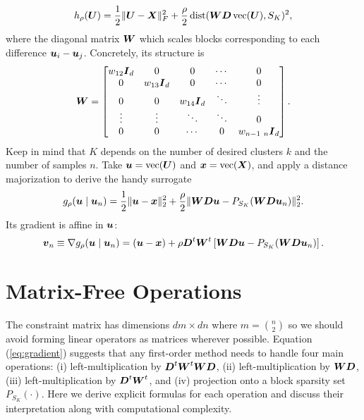 \documentclass[11pt]{article}
\begin{document}
\begin{equation}
    \label{eq:penalized-loss}
    h_{\rho}(\boldsymbol{U})
    =
    \frac{1}{2}\|\boldsymbol{U} - \boldsymbol{X}\|_{F}^{2}
    +
    \frac{\rho}{2} \mathop{\rm dist}\nolimits(\boldsymbol{W} \boldsymbol{D} \mathop{\rm vec}\nolimits(\boldsymbol{U}), S_{K})^{2},
\end{equation}
where the diagonal matrix \(\boldsymbol{W}\) which scales blocks corresponding to each difference \(\boldsymbol{u}_{i} - \boldsymbol{u}_{j}\).
Concretely, its structure is
\begin{equation*}
    \boldsymbol{W}
    =
    \begin{bmatrix}
        w_{12} \boldsymbol{I}_{d} & 0 & 0 & \cdots & 0 \\
        0 & w_{13} \boldsymbol{I}_{d} & 0 & \cdots & 0 \\
        0 & 0 & w_{14} \boldsymbol{I}_{d} & \ddots & \vdots \\
        \vdots & \vdots & \ddots & \ddots & 0\\
        0 & 0 & \cdots & 0 & w_{n-1~n} \boldsymbol{I}_{d}
    \end{bmatrix}.
\end{equation*}
Keep in mind that \(K\) depends on the number of desired clusters \(k\) and the number of samples \(n\).
Take \(\boldsymbol{u} = \mathop{\rm vec}\nolimits(\boldsymbol{U})\) and \(\boldsymbol{x} = \mathop{\rm vec}\nolimits(\boldsymbol{X})\), and apply a distance majorization to derive the handy surrogate
\begin{equation}
    \label{eq:surrogate}
    g_{\rho}(\boldsymbol{u} \mid \boldsymbol{u}_{n})
    =
    \frac{1}{2}\|\boldsymbol{u} - \boldsymbol{x}\|_{2}^{2}
    +
    \frac{\rho}{2}
    \| \boldsymbol{W} \boldsymbol{D} \boldsymbol{u} - P_{S_{K}}(\boldsymbol{W} \boldsymbol{D} \boldsymbol{u}_{n}) \|_{2}^{2}.
\end{equation}
Its gradient is affine in \(\boldsymbol{u}\):
\begin{equation}
    \label{eq:gradient}
    \boldsymbol{v}_{n}
    \equiv
    \nabla g_{\rho}(\boldsymbol{u} \mid \boldsymbol{u}_{n})
    =
    (\boldsymbol{u} - \boldsymbol{x})
    +
    \rho \boldsymbol{D}^{t} \boldsymbol{W}^{t} \left[
        \boldsymbol{W} \boldsymbol{D} \boldsymbol{u} - P_{S_{K}}(\boldsymbol{W} \boldsymbol{D} \boldsymbol{u}_{n})
    \right].
\end{equation}

\section*{\center Matrix-Free Operations}

The constraint matrix has dimensions \(dm \times dn\) where \(m = \binom{n}{2}\) so we should avoid forming linear operators as matrices wherever possible.
Equation (\ref{eq:gradient}) suggests that any first-order method needs to handle four main operations: (i) left-multiplication by \(\boldsymbol{D}^{t} \boldsymbol{W}^{t} \boldsymbol{W} \boldsymbol{D}\), (ii) left-multiplication by \(\boldsymbol{W} \boldsymbol{D}\), (iii) left-multiplication by \(\boldsymbol{D}^{t} \boldsymbol{W}^{t}\), and (iv) projection onto a block sparsity set \(P_{S_{K}}(\cdot)\).
Here we derive explicit formulas for each operation and discuss their interpretation along with computational complexity.
\end{document}
